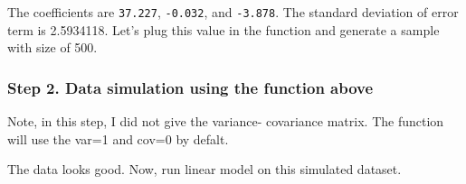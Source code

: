 \documentclass[
]{article}
\newenvironment{Shaded}{\begin{snugshade}}{\end{snugshade}}
\newcommand{\AttributeTok}[1]{\textcolor[rgb]{0.77,0.63,0.00}{#1}}
\newcommand{\DecValTok}[1]{\textcolor[rgb]{0.00,0.00,0.81}{#1}}
\newcommand{\FloatTok}[1]{\textcolor[rgb]{0.00,0.00,0.81}{#1}}
\newcommand{\FunctionTok}[1]{\textcolor[rgb]{0.00,0.00,0.00}{#1}}
\newcommand{\NormalTok}[1]{#1}
\newcommand{\OtherTok}[1]{\textcolor[rgb]{0.56,0.35,0.01}{#1}}
\newcommand{\SpecialCharTok}[1]{\textcolor[rgb]{0.00,0.00,0.00}{#1}}
\newcommand{\StringTok}[1]{\textcolor[rgb]{0.31,0.60,0.02}{#1}}
\begin{document}
The coefficients are \texttt{37.227}, \texttt{-0.032}, and
\texttt{-3.878}. The standard deviation of error term is 2.5934118.
Let's plug this value in the function and generate a sample with size of
500.

\hypertarget{step-2.-data-simulation-using-the-function-above}{%
\subsubsection{Step 2. Data simulation using the function
above}\label{step-2.-data-simulation-using-the-function-above}}

Note, in this step, I did not give the variance- covariance matrix. The
function will use the var=1 and cov=0 by defalt.

\begin{Shaded}
\end{Shaded}

The data looks good. Now, run linear model on this simulated dataset.
\end{document}

